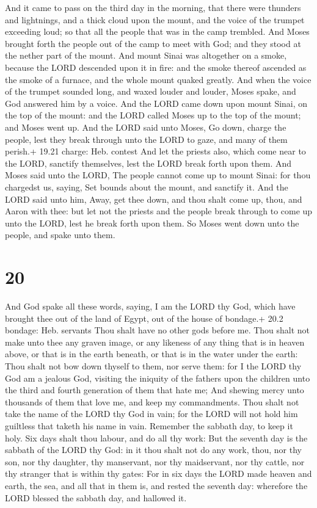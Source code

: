  And it came to pass on the third day in the morning,
that there were thunders and lightnings, and a thick cloud upon the
mount, and the voice of the trumpet exceeding loud; so that all the
people that was in the camp trembled.  And Moses brought
forth the people out of the camp to meet with God; and they stood at the
nether part of the mount.  And mount Sinai was altogether
on a smoke, because the LORD descended upon it in fire: and the smoke
thereof ascended as the smoke of a furnace, and the whole mount quaked
greatly.  And when the voice of the trumpet sounded long,
and waxed louder and louder, Moses spake, and God answered him by a
voice.  And the LORD came down upon mount Sinai, on the top
of the mount: and the LORD called Moses up to the top of the mount; and
Moses went up.  And the LORD said unto Moses, Go down,
charge the people, lest they break through unto the LORD to gaze, and
many of them perish.+ 19.21 charge: Heb. contest  And let
the priests also, which come near to the LORD, sanctify themselves, lest
the LORD break forth upon them.  And Moses said unto the
LORD, The people cannot come up to mount Sinai: for thou chargedst us,
saying, Set bounds about the mount, and sanctify it.  And
the LORD said unto him, Away, get thee down, and thou shalt come up,
thou, and Aaron with thee: but let not the priests and the people break
through to come up unto the LORD, lest he break forth upon them.
 So Moses went down unto the people, and spake unto them.

\hypertarget{section-19}{%
\section{20}\label{section-19}}

 And God spake all these words, saying,  I am
the LORD thy God, which have brought thee out of the land of Egypt, out
of the house of bondage.+ 20.2 bondage: Heb. servants  Thou
shalt have no other gods before me.  Thou shalt not make
unto thee any graven image, or any likeness of any thing that is in
heaven above, or that is in the earth beneath, or that is in the water
under the earth:  Thou shalt not bow down thyself to them,
nor serve them: for I the LORD thy God am a jealous God, visiting the
iniquity of the fathers upon the children unto the third and fourth
generation of them that hate me;  And shewing mercy unto
thousands of them that love me, and keep my commandments. 
Thou shalt not take the name of the LORD thy God in vain; for the LORD
will not hold him guiltless that taketh his name in vain. 
Remember the sabbath day, to keep it holy.  Six days shalt
thou labour, and do all thy work:  But the seventh day is
the sabbath of the LORD thy God: in it thou shalt not do any work, thou,
nor thy son, nor thy daughter, thy manservant, nor thy maidservant, nor
thy cattle, nor thy stranger that is within thy gates:  For
in six days the LORD made heaven and earth, the sea, and all that in
them is, and rested the seventh day: wherefore the LORD blessed the
sabbath day, and hallowed it.

